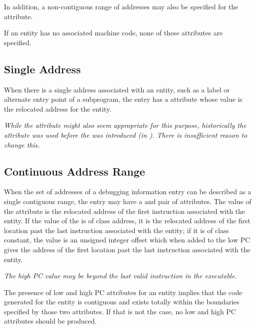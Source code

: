 In addition, a non-contiguous range of 
addresses may also be specified for the
 attribute.

If an entity has no associated machine code, 
none of these attributes are specified.

\subsection{Single Address} 
When there is a single address associated with an entity,
such as a label or alternate entry point of a subprogram,
the entry has a  attribute whose value is the
relocated address for the entity.

\textit{While the 
attribute might also seem appropriate for this purpose,
historically the  attribute was used before the
 was introduced 
(in ). There is
insufficient reason to change this.}

\subsection{Continuous Address Range}
\label{chap:contiguousaddressranges}
When the set of addresses of a debugging information entry can
be described as a single contiguous range, the entry 
may 
have
a  and 
 pair of attributes. 
The value
of the 
 attribute 
is the relocated address of the
first instruction associated with the entity. If the value of
the  is of class address, it is the relocated
address of the first location past the last instruction
associated with the entity; if it is of class constant, the
value is an unsigned integer offset which when added to the
low PC gives the address of the first location past the last
instruction associated with the entity.

\textit{The high PC value
may be beyond the last valid instruction in the executable.}

The presence of low and high PC attributes for an entity
implies that the code generated for the entity is contiguous
and exists totally within the boundaries specified by those
two attributes. If that is not the case, no low and high PC
attributes should be produced.

